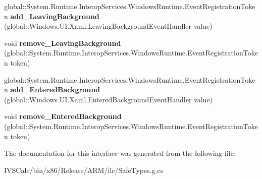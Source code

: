 \begin{DoxyCompactItemize}
global\+::\+System.\+Runtime.\+Interop\+Services.\+Windows\+Runtime.\+Event\+Registration\+Token {\bfseries add\+\_\+\+Leaving\+Background} (global\+::\+Windows.\+U\+I.\+Xaml.\+Leaving\+Background\+Event\+Handler value)
\item 
\mbox{\label{interface_windows_1_1_u_i_1_1_xaml_1_1_i_application2_a884312cad0a35622df0fc362403e4798}} 
void {\bfseries remove\+\_\+\+Leaving\+Background} (global\+::\+System.\+Runtime.\+Interop\+Services.\+Windows\+Runtime.\+Event\+Registration\+Token token)
\item 
\mbox{\label{interface_windows_1_1_u_i_1_1_xaml_1_1_i_application2_a0f800d5d5f7d3aef7f361e86183cd64b}} 
global\+::\+System.\+Runtime.\+Interop\+Services.\+Windows\+Runtime.\+Event\+Registration\+Token {\bfseries add\+\_\+\+Entered\+Background} (global\+::\+Windows.\+U\+I.\+Xaml.\+Entered\+Background\+Event\+Handler value)
\item 
\mbox{\label{interface_windows_1_1_u_i_1_1_xaml_1_1_i_application2_a7c5c73853965e2fd025af371c00a6c28}} 
void {\bfseries remove\+\_\+\+Entered\+Background} (global\+::\+System.\+Runtime.\+Interop\+Services.\+Windows\+Runtime.\+Event\+Registration\+Token token)
\end{DoxyCompactItemize}


The documentation for this interface was generated from the following file\+:\begin{DoxyCompactItemize}
\item 
I\+V\+S\+Calc/bin/x86/\+Release/\+A\+R\+M/ilc/Safe\+Types.\+g.\+cs\end{DoxyCompactItemize}
